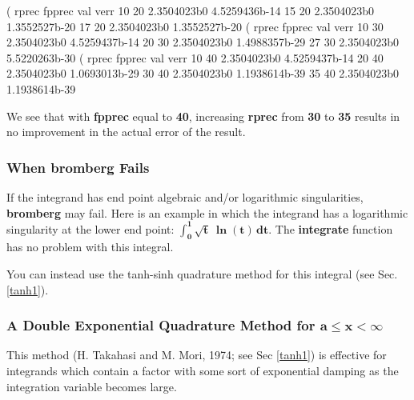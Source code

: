 \documentclass[12pt]{article}
\begin{document}
\begin{myVerbatim}
(%
 rprec   fpprec     val             verr    
   10     20     2.3504023b0     4.5259436b-14 
   15     20     2.3504023b0     1.3552527b-20 
   17     20     2.3504023b0     1.3552527b-20 
(%
 rprec   fpprec     val             verr    
   10     30     2.3504023b0     4.5259437b-14 
   20     30     2.3504023b0     1.4988357b-29 
   27     30     2.3504023b0     5.5220263b-30 
(%
 rprec   fpprec     val             verr    
   10     40     2.3504023b0     4.5259437b-14 
   20     40     2.3504023b0     1.0693013b-29 
   30     40     2.3504023b0     1.1938614b-39 
   35     40     2.3504023b0     1.1938614b-39 
\end{myVerbatim} 
We see that with \textbf{fpprec} equal to \textbf{40}, increasing \textbf{rprec} 
  from \textbf{30} to \textbf{35} 
  results in no improvement in the actual error of the result.
\newpage
\subsubsection*{When \textbf{bromberg} Fails}
If the integrand has end point algebraic and/or logarithmic singularities, \textbf{bromberg} may fail.
Here is an example in which the integrand has a
  logarithmic singularity at the lower end point:
   $\mathbf{\int_{0}^{1} \sqrt{t}\,\boldsymbol{\ln}(t)\,dt}$.
The \textbf{integrate} function has no problem with this integral. 
You can instead use the tanh-sinh quadrature method for this integral (see Sec. \ref{tanh1}).
\subsubsection{A \textbf{Double Exponential} Quadrature Method for $\mathbf{a \leq x < \infty}$} \label{de1}
This method (H. Takahasi and M. Mori, 1974; see Sec \ref{tanh1}) is effective for integrands
  which contain a factor with some sort of exponential damping as the integration variable
  becomes large.\\
\end{document}
